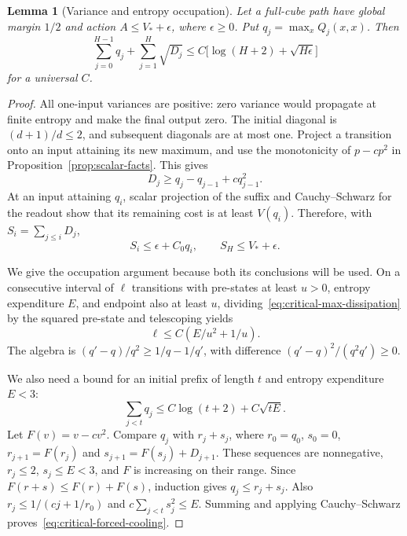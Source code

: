 \documentclass[11pt]{article}
\newtheorem{lemma}[theorem]{Lemma}
\theoremstyle{remark}
\begin{document}
\begin{lemma}[Variance and entropy occupation]
\label{lem:critical-occupation}
Let a full-cube path have global margin $1/2$ and action
$A\le V_*+\epsilon$, where $\epsilon\ge0$. Put
$q_j=\max_x Q_j(x,x)$. Then
\[
 \sum_{j=0}^{H-1}q_j+\sum_{j=1}^H\sqrt{D_j}
 \le C\bigl[\log(H+2)+\sqrt{H\epsilon}\bigr]
\]
for a universal $C$.
\end{lemma}
\begin{proof}
All one-input variances are positive: zero variance would propagate
at finite entropy and make the final output zero. The initial
diagonal is $(d+1)/d\le2$, and subsequent diagonals are at most one.
Project a transition onto an input attaining its new maximum, and
use the monotonicity of $p-cp^2$ in Proposition~\ref{prop:scalar-facts}.
This gives
\begin{equation}
 D_j\ge q_j-q_{j-1}+cq_{j-1}^2.
 \label{eq:critical-max-dissipation}
\end{equation}
At an input attaining $q_i$, scalar projection of the suffix and
Cauchy--Schwarz for the readout show that its remaining cost is at
least $V(q_i)$. Therefore, with $S_i=\sum_{j\le i}D_j$,
\begin{equation}
 S_i\le\epsilon+C_0q_i,
 \qquad S_H\le V_*+\epsilon.
 \label{eq:critical-prefix-budget}
\end{equation}

We give the occupation argument because both its conclusions will
be used. On a consecutive interval of $\ell$ transitions with
pre-states at least $u>0$, entropy expenditure $E$, and endpoint
also at least $u$, dividing~\eqref{eq:critical-max-dissipation} by
the squared pre-state and telescoping yields
\begin{equation}
 \ell\le C(E/u^2+1/u).
 \label{eq:critical-reciprocal-occupation}
\end{equation}
The algebra is
$(q'-q)/q^2\ge1/q-1/q'$, with difference
$(q'-q)^2/(q^2q')\ge0$.

We also need a bound for an initial prefix of length $t$ and entropy
expenditure $E<3$:
\begin{equation}
 \sum_{j<t}q_j\le C\log(t+2)+C\sqrt{tE}.
 \label{eq:critical-forced-cooling}
\end{equation}
Let $F(v)=v-cv^2$. Compare $q_j$ with $r_j+s_j$, where
$r_0=q_0$, $s_0=0$, $r_{j+1}=F(r_j)$ and
$s_{j+1}=F(s_j)+D_{j+1}$. These sequences are nonnegative,
$r_j\le2$, $s_j\le E<3$, and $F$ is increasing on their range.
Since $F(r+s)\le F(r)+F(s)$, induction gives $q_j\le r_j+s_j$.
Also $r_j\le1/(cj+1/r_0)$ and
$c\sum_{j<t}s_j^2\le E$. Summing and applying Cauchy--Schwarz
proves~\eqref{eq:critical-forced-cooling}.


\end{proof}
\end{document}
